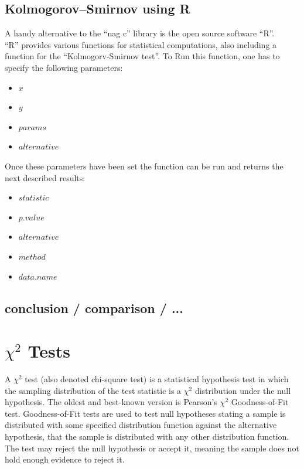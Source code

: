 \documentclass{article}
\begin{document}
\subsection{Kolmogorov–Smirnov using R}
A handy alternative to the ``nag c'' library is the open source software ``R''.\\
``R'' provides various functions for statistical computations, also including a function for the ``Kolmogorv-Smirnov test''. To Run this function, one has to specify the following parameters:
\begin{itemize}
\item $x$
\item $y$
\item $params$
\item $alternative$
\end{itemize}
Once these parameters have been set the function can be run and returns the next described results:
\begin{itemize}
\item $statistic$
\item $p.value$
\item $alternative$
\item $method$
\item $data.name$
\end{itemize}
\subsection{conclusion / comparison / ...}


\section{$\chi^2$ Tests}
A $\chi^2$ test (also denoted chi-square test) is a statistical hypothesis test in which the sampling distribution of the test statistic is a $\chi^2$ distribution under the null hypothesis.
The oldest and best-known version is Pearson's $\chi^2$ Goodness-of-Fit test.
Goodness-of-Fit tests are used to test null hypotheses stating a sample is distributed with some specified distribution function against the alternative hypothesis, that the sample is distributed with any other distribution function.
The test may reject the null hypothesis or accept it, meaning the sample does not hold enough evidence to reject it.
\end{document}
